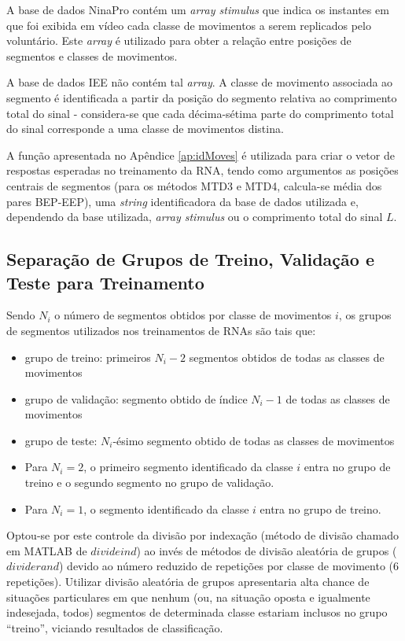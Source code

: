 A base de dados NinaPro contém um \emph{array stimulus} que indica os instantes em que foi exibida em vídeo cada classe de movimentos a serem replicados pelo voluntário. Este \emph{array} é utilizado para obter a relação entre posições de segmentos e classes de movimentos.

A base de dados IEE não contém tal \emph{array}. A classe de movimento associada ao segmento é identificada a partir da posição do segmento relativa ao comprimento total do sinal - considera-se que cada décima-sétima parte do comprimento total do sinal corresponde a uma classe de movimentos distina.

A função apresentada no Apêndice \ref{ap:idMoves} é utilizada para criar o vetor de respostas esperadas no treinamento da RNA, tendo como argumentos as posições centrais de segmentos (para os métodos MTD3 e MTD4, calcula-se média dos pares BEP-EEP), uma \emph{string} identificadora da base de dados utilizada e, dependendo da base utilizada, \emph{array stimulus} ou o comprimento total do sinal $L$.

			\subsection{Separação de Grupos de Treino, Validação e Teste para Treinamento}
Sendo $N_i$ o número de segmentos obtidos por classe de movimentos $i$, os grupos de segmentos utilizados nos treinamentos de RNAs são tais que: 

\begin{itemize}
\item grupo de treino: primeiros $N_i-2$ segmentos obtidos de todas as classes de movimentos
\item grupo de validação: segmento obtido de índice $N_i-1$ de todas as classes de movimentos
\item grupo de teste: $N_i$-ésimo segmento obtido de todas as classes de movimentos
\item Para $N_i=2$, o primeiro segmento identificado da classe $i$ entra no grupo de treino e o segundo segmento no grupo de validação.
\item Para $N_i=1$, o segmento identificado da classe $i$ entra no grupo de treino.
\end{itemize}

Optou-se por este controle da divisão por indexação (método de divisão chamado em MATLAB de $divideind$) ao invés de métodos de divisão aleatória de grupos ($dividerand$) devido ao número reduzido de repetições por classe de movimento (6 repetições). Utilizar divisão aleatória de grupos apresentaria alta chance de situações particulares em que nenhum (ou, na situação oposta e igualmente indesejada, todos) segmentos de determinada classe estariam inclusos no grupo ``treino'', viciando resultados de classificação.

